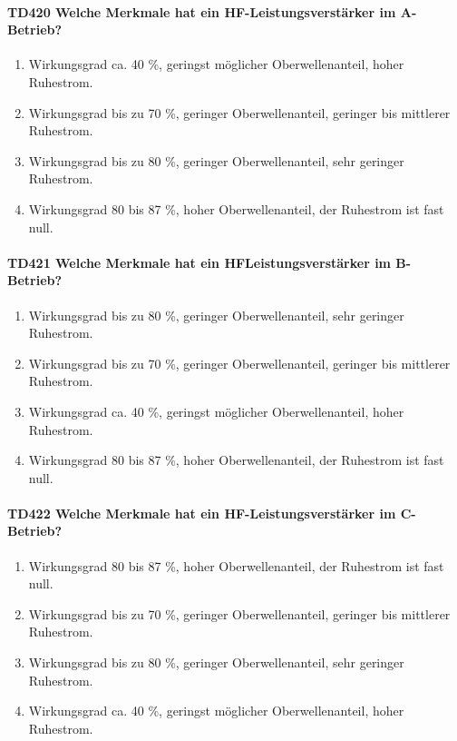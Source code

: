 \documentclass[8pt]{article}
\begin{document}
\begin{enumerate}
\begin{enumerate}[nolistsep,label=\Alph*]
\paragraph*{TD420 Welche Merkmale hat ein HF-Leistungsverstärker im A-Betrieb?}
\begin{enumerate}[nolistsep,label=\Alph*]
\item Wirkungsgrad ca. 40 \%, geringst möglicher Oberwellenanteil, hoher Ruhestrom. 
\item Wirkungsgrad bis zu 70 \%, geringer Oberwellenanteil, geringer bis mittlerer Ruhestrom.
\item Wirkungsgrad bis zu 80 \%, geringer Oberwellenanteil, sehr geringer Ruhestrom.
\item Wirkungsgrad 80 bis 87 \%, hoher Oberwellenanteil, der Ruhestrom ist fast null.
\end{enumerate}

\paragraph*{TD421 Welche Merkmale hat ein HFLeistungsverstärker im B-Betrieb?} 
\begin{enumerate}[nolistsep,label=\Alph*]
\item Wirkungsgrad bis zu 80 \%, geringer Oberwellenanteil, sehr geringer Ruhestrom.
\item Wirkungsgrad bis zu 70 \%, geringer Oberwellenanteil, geringer bis mittlerer Ruhestrom.
\item Wirkungsgrad ca. 40 \%, geringst möglicher Oberwellenanteil, hoher Ruhestrom.
\item Wirkungsgrad 80 bis 87 \%, hoher Oberwellenanteil, der Ruhestrom ist fast null.
\end{enumerate}

\paragraph*{TD422 Welche Merkmale hat ein HF-Leistungsverstärker im C-Betrieb?}
\begin{enumerate}[nolistsep,label=\Alph*]
\item Wirkungsgrad 80 bis 87 \%, hoher Oberwellenanteil, der Ruhestrom ist fast null.
\item Wirkungsgrad bis zu 70 \%, geringer Oberwellenanteil, geringer bis mittlerer Ruhestrom. 
\item Wirkungsgrad bis zu 80 \%, geringer Oberwellenanteil, sehr geringer Ruhestrom.
\item Wirkungsgrad ca. 40 \%, geringst möglicher Oberwellenanteil, hoher Ruhestrom.
\end{enumerate}


\end{enumerate}
\end{enumerate}
\end{document}
